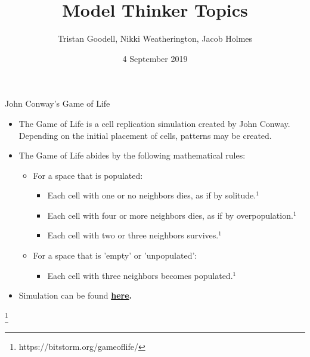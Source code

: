 \documentclass{beamer}
\title{Model Thinker Topics}
\author{Tristan Goodell, Nikki Weatherington, Jacob Holmes}
\institute[]{Arkansas School for Mathematics, Sciences, and the Arts}
\date{4 September 2019}
\begin{document}
\maketitle

\begin{frame}{John Conway's Game of Life}

    \begin{itemize}
        \item The Game of Life is a cell replication simulation created by John Conway. Depending on the initial placement of cells, patterns may be created.
        \item The Game of Life abides by the following mathematical rules:
        \begin{itemize}
            \item For a space that is populated: 
            \begin{itemize}
                \item Each cell with one or no neighbors dies, as if by solitude.$^1$ 
                \item Each cell with four or more neighbors dies, as if by overpopulation.$^1$  
                \item Each cell with two or three neighbors survives.$^1$  
            \end{itemize}
            \item For a space that is 'empty' or 'unpopulated':
            \begin{itemize}
                \item Each cell with three neighbors becomes populated.$^1$  
            \end{itemize}
        \end{itemize}
        \item Simulation can be found \bf \href{https://bitstorm.org/gameoflife/}{here}. 
    \end{itemize}
    \footnote{https://bitstorm.org/gameoflife/}
\end{frame}
\end{document}
